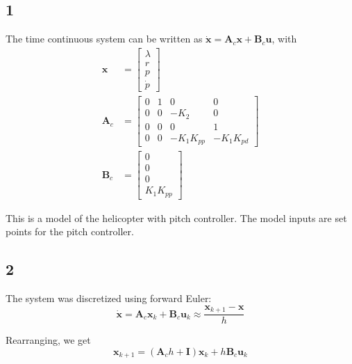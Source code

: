 \subsection{1}
The time continuous system can be written as $\mathbf{\dot{x}} = \mathbf{A}_c\mathbf{x}+ \mathbf{B}_c\mathbf{u}$, with
\begin{subequations}
    \begin{align}
        \mathbf{x} &= \begin{bmatrix}
            \lambda\\
            r\\
            p\\
            \dot{p}
        \end{bmatrix}\\
        \mathbf{A}_c &= \begin{bmatrix}
            0 & 1 & 0 & 0\\
            0 & 0 & -K_2 & 0\\
            0 & 0 & 0 & 1\\
            0 & 0& -K_1K_{pp} & -K_1K_{pd}
        \end{bmatrix} \\
        \mathbf{B}_c &= \begin{bmatrix}
            0\\
            0\\
            0\\
            K_1K_{pp}
        \end{bmatrix}
    \end{align}
\end{subequations}

This is a model of the helicopter with pitch controller. The model inputs are set points for the pitch controller.

\subsection{2}
The system was discretized using forward Euler:
\begin{equation}
    \mathbf{\dot{x}} = \mathbf{A}_c\mathbf{x}_k + \mathbf{B}_c\mathbf{u}_k \approx \frac{\mathbf{x}_{k+1}-\mathbf{x}}{h}
\end{equation}

Rearranging, we get
\begin{equation}
    \mathbf{x}_{k+1} = (\mathbf{A}_ch + \mathbf{I})\mathbf{x}_k + h\mathbf{B}_c\mathbf{u}_k
\end{equation}

